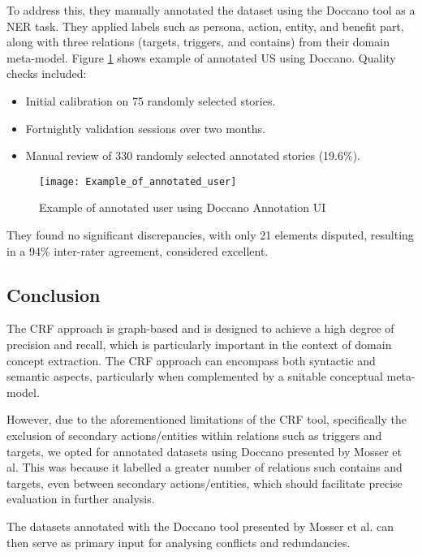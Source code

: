 To address this, they manually annotated the dataset using the Doccano tool as a NER task. They applied labels such as persona, action, entity, and benefit part, along with three relations (targets, triggers, and contains) from their domain meta-model. Figure \ref{fig:annot_usr} shows example of annotated US using Doccano. Quality checks included:
\begin{itemize}
	\item Initial calibration on 75 randomly selected stories.
	
	\item Fortnightly validation sessions over two months.
	
	\item Manual review of 330 randomly selected annotated stories (19.6\%).
	
\end{itemize}
\begin{figure}[h]
	\centering
	\texttt{[image: Example\_of\_annotated\_user]}
	\caption{Example of annotated user using Doccano Annotation UI \cite{arulmohan2023extracting}}\label{fig:annot_usr}
\end{figure}

They found no significant discrepancies, with only 21 elements disputed, resulting in a 94\% inter-rater agreement, considered excellent.


\subsection*{Conclusion}\label{crf_conclusion}
The CRF approach is graph-based and is designed to achieve a high degree of precision and recall, which is particularly important in the context of domain concept extraction. The CRF approach can encompass both syntactic and semantic aspects, particularly when complemented by a suitable conceptual meta-model.

However, due to the aforementioned limitations of the CRF tool, specifically the exclusion of secondary actions/entities within relations such as triggers and targets, we opted for annotated datasets using Doccano presented by Mosser et al. This was because it labelled a greater number of relations such contains and targets, even between secondary actions/entities, which should facilitate precise evaluation in further analysis. 

The datasets annotated with the Doccano tool presented by Mosser et al. can then serve as primary input for analysing conflicts and redundancies.

